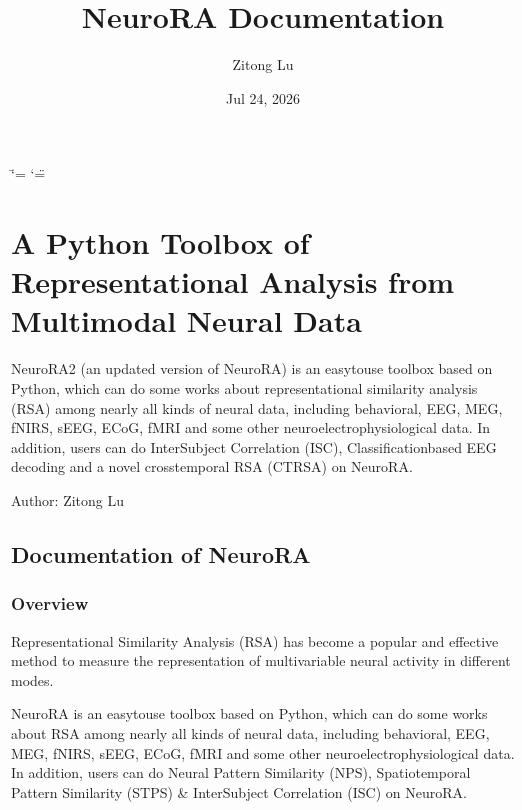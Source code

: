 \documentclass[letterpaper,10pt,english]{sphinxhowto}
\title{NeuroRA Documentation}
\date{Jul 24, 2026}
\author{Zitong Lu}
\begin{document}
\ifdefined\shorthandoff
  \ifnum\catcode`\=\string=\active\shorthandoff{=}\fi
  \ifnum\catcode`\"=\active{}\fi
\fi

\pagestyle{empty}
\sphinxmaketitle
\pagestyle{plain}
\sphinxtableofcontents
\pagestyle{normal}
\label{\detokenize{index::doc}}



\section{A Python Toolbox of Representational Analysis from Multi\sphinxhyphen{}modal Neural Data}
\label{\detokenize{index:a-python-toolbox-of-representational-analysis-from-multi-modal-neural-data}}
\sphinxAtStartPar
NeuroRA2 (an updated version of NeuroRA) is an easy\sphinxhyphen{}to\sphinxhyphen{}use toolbox based on Python, which can do some works about representational similarity analysis (RSA) among nearly all kinds of neural data, including behavioral, EEG, MEG, fNIRS, sEEG, ECoG, fMRI and some other neuroelectrophysiological data. In addition, users can do Inter\sphinxhyphen{}Subject Correlation (ISC), Classification\sphinxhyphen{}based EEG decoding and a novel cross\sphinxhyphen{}temporal RSA (CTRSA) on NeuroRA.

\sphinxAtStartPar
Author: Zitong Lu


\subsection{Documentation of NeuroRA}
\label{\detokenize{index:documentation-of-neurora}}
\sphinxstepscope


\subsubsection{Overview}
\label{\detokenize{overview:overview}}\label{\detokenize{overview::doc}}
\sphinxAtStartPar
Representational Similarity Analysis (RSA) has become a popular and effective method to measure the representation of multivariable neural activity in different modes.

\sphinxAtStartPar
NeuroRA is an easy\sphinxhyphen{}to\sphinxhyphen{}use toolbox based on Python, which can do some works about RSA among nearly all kinds of neural data, including behavioral, EEG, MEG, fNIRS, sEEG, ECoG, fMRI and some other neuroelectrophysiological data. In addition, users can do Neural Pattern Similarity (NPS), Spatiotemporal Pattern Similarity (STPS) \& Inter\sphinxhyphen{}Subject Correlation (ISC) on NeuroRA.
\end{document}
